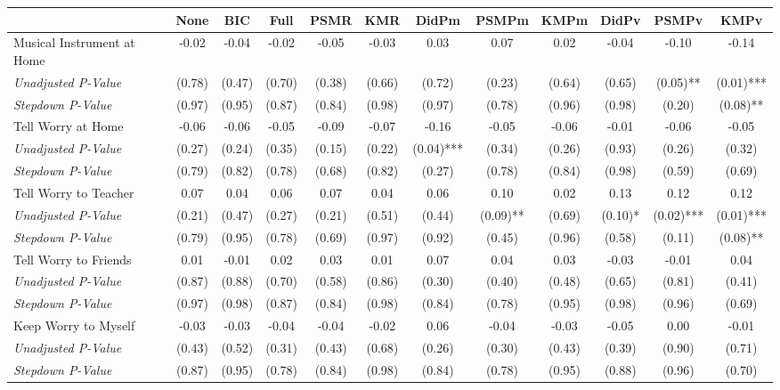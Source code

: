 \begin{tabular}{l c c c c c c c c c c c}
\toprule
 & None & BIC & Full & PSMR & KMR & DidPm & PSMPm & KMPm & DidPv & PSMPv & KMPv \\
\midrule
Musical Instrument at Home & -0.02 & -0.04 & -0.02 & -0.05 & -0.03 & 0.03 & 0.07 & 0.02 & -0.04 & -0.10 & -0.14 \\
\quad \textit{Unadjusted P-Value} & (0.78) & (0.47) & (0.70) & (0.38) & (0.66) & (0.72) & (0.23) & (0.64) & (0.65) & (0.05)** & (0.01)*** \\
\quad \textit{Stepdown P-Value} & (0.97) & (0.95) & (0.87) & (0.84) & (0.98) & (0.97) & (0.78) & (0.96) & (0.98) & (0.20) & (0.08)** \\
Tell Worry at Home & -0.06 & -0.06 & -0.05 & -0.09 & -0.07 & -0.16 & -0.05 & -0.06 & -0.01 & -0.06 & -0.05 \\
\quad \textit{Unadjusted P-Value} & (0.27) & (0.24) & (0.35) & (0.15) & (0.22) & (0.04)*** & (0.34) & (0.26) & (0.93) & (0.26) & (0.32) \\
\quad \textit{Stepdown P-Value} & (0.79) & (0.82) & (0.78) & (0.68) & (0.82) & (0.27) & (0.78) & (0.84) & (0.98) & (0.59) & (0.69) \\
Tell Worry to Teacher & 0.07 & 0.04 & 0.06 & 0.07 & 0.04 & 0.06 & 0.10 & 0.02 & 0.13 & 0.12 & 0.12 \\
\quad \textit{Unadjusted P-Value} & (0.21) & (0.47) & (0.27) & (0.21) & (0.51) & (0.44) & (0.09)** & (0.69) & (0.10)* & (0.02)*** & (0.01)*** \\
\quad \textit{Stepdown P-Value} & (0.79) & (0.95) & (0.78) & (0.69) & (0.97) & (0.92) & (0.45) & (0.96) & (0.58) & (0.11) & (0.08)** \\
Tell Worry to Friends & 0.01 & -0.01 & 0.02 & 0.03 & 0.01 & 0.07 & 0.04 & 0.03 & -0.03 & -0.01 & 0.04 \\
\quad \textit{Unadjusted P-Value} & (0.87) & (0.88) & (0.70) & (0.58) & (0.86) & (0.30) & (0.40) & (0.48) & (0.65) & (0.81) & (0.41) \\
\quad \textit{Stepdown P-Value} & (0.97) & (0.98) & (0.87) & (0.84) & (0.98) & (0.84) & (0.78) & (0.95) & (0.98) & (0.96) & (0.69) \\
Keep Worry to Myself & -0.03 & -0.03 & -0.04 & -0.04 & -0.02 & 0.06 & -0.04 & -0.03 & -0.05 & 0.00 & -0.01 \\
\quad \textit{Unadjusted P-Value} & (0.43) & (0.52) & (0.31) & (0.43) & (0.68) & (0.26) & (0.30) & (0.43) & (0.39) & (0.90) & (0.71) \\
\quad \textit{Stepdown P-Value} & (0.87) & (0.95) & (0.78) & (0.84) & (0.98) & (0.84) & (0.78) & (0.95) & (0.88) & (0.96) & (0.70) \\

\end{tabular}

